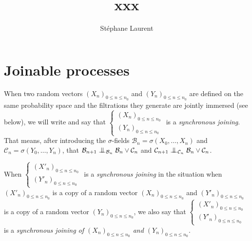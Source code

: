 \documentclass[12pt,a4paper]{article}
\author{Stéphane Laurent}
\title{xxx}
\begin{document}
\theoremstyle{defstyle}
\newtheorem{definition}{Definition}
\newtheorem{remark}{Remark}
\newtheorem{question}{Question}
\newtheorem{clarify}{To clarify}
\theoremstyle{thmstyle}
\newtheorem{thm}{Theorem}[section]
\newtheorem{ppsition}{Proposition}
\newtheorem{lemma}{Lemma}

\newcommand{\BB}{\mathcal{B}}
\newcommand{\CC}{\mathcal{C}}
\newcommand{\FF}{\mathcal{F}}
\newcommand{\GG}{\mathcal{G}}
\newcommand{\EE}{\mathbb{E}}
\newcommand{\HH}{\mathcal{H}}
\newcommand{\II}{\mathcal{I}}
\newcommand{\LL}{\mathcal{L}}
\newcommand{\OO}{\mathcal{O}}
\newcommand{\XX}{\mathcal{X}}
\newcommand{\given}{\mid}
\newcommand{\eps}{\epsilon}
\newcommand{\indic}{\boldsymbol 1}
\newcommand{\Vb}{\boldsymbol V}
\newcommand{\tildV}{\widetilde{V}}

\newcommand{\indvee}{\dot{\vee}}
\newcommand{\indep}{\mathrel{\text{\scalebox{1.07}{$\perp\mkern-10mu\perp$}}}}


\maketitle

\section{Joinable processes}

When two random vectors 
${(X_n)}_{0 \leq n \leq n_0}$ and ${(Y_n)}_{0 \leq n \leq n_0}$ are defined 
on the same probability space and the filtrations they generate are 
jointly immersed (see below), we will write and say that 
$\left\{\begin{smallmatrix} {(X_n)}_{0 \leq n \leq n_0} \\ 
{(Y_n)}_{0 \leq n \leq n_0}
\end{smallmatrix}\right.$  is a \emph{synchronous joining}. 
That means, after introducing the $\sigma$-fields 
$\BB_n = \sigma(X_{0}, \ldots, X_n)$ and  
$\CC_n = \sigma(Y_{0}, \ldots, Y_n)$, that 
$\BB_{n+1} \indep_{\BB_n} \BB_n \vee \CC_n$ 
and $\CC_{n+1} \indep_{\CC_n} \BB_n \vee \CC_n$.  

When $\left\{\begin{smallmatrix} {(X'_n)}_{0 \leq n \leq n_0} \\ 
{(Y'_n)}_{0 \leq n \leq n_0}
\end{smallmatrix}\right.$  is a \emph{synchronous joining} in the situation when 
${(X'_n)}_{0 \leq n \leq n_0}$ is a copy of a random vector 
${(X_n)}_{0 \leq n \leq n_0}$  and ${(Y'_n)}_{0 \leq n \leq n_0}$ 
is a copy of a random vector ${(Y_n)}_{0 \leq n \leq n_0}$, we also say that 
$\left\{\begin{smallmatrix} {(X'_n)}_{0 \leq n \leq n_0} \\ 
{(Y'_n)}_{0 \leq n \leq n_0}
\end{smallmatrix}\right.$  is a \emph{synchronous joining of 
${(X_n)}_{0 \leq n \leq n_0}$ and ${(Y_n)}_{0 \leq n \leq n_0}$}. 
\end{document}
